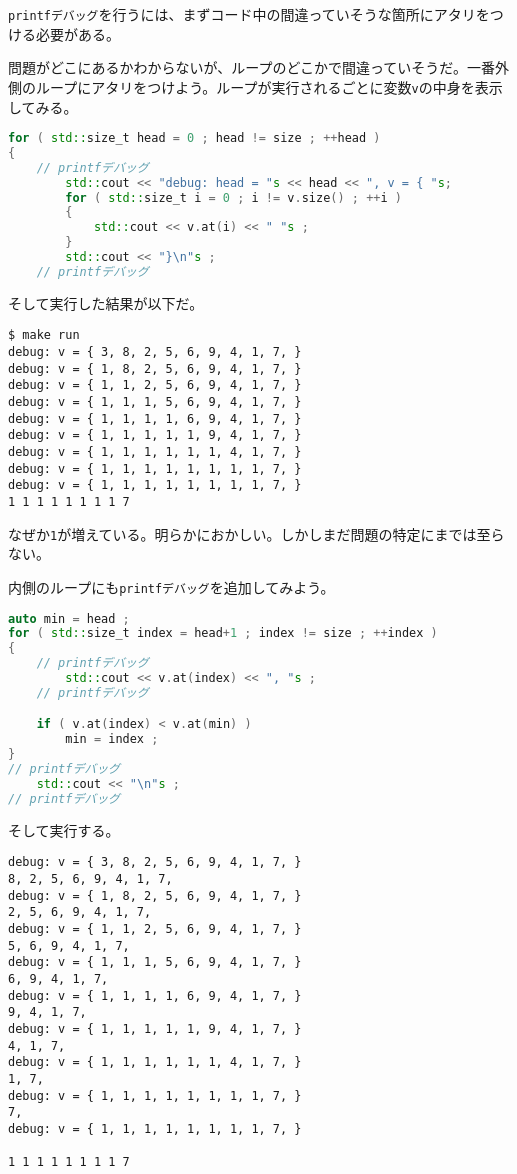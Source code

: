 \texttt{printfデバッグ}を行うには、まずコード中の間違っていそうな箇所にアタリをつける必要がある。

問題がどこにあるかわからないが、ループのどこかで間違っていそうだ。一番外側のループにアタリをつけよう。ループが実行されるごとに変数\texttt{v}の中身を表示してみる。

\begin{lstlisting}[language={C++}]
for ( std::size_t head = 0 ; head != size ; ++head )
{
    // printfデバッグ
        std::cout << "debug: head = "s << head << ", v = { "s;
        for ( std::size_t i = 0 ; i != v.size() ; ++i )
        {
            std::cout << v.at(i) << " "s ;
        }
        std::cout << "}\n"s ;
    // printfデバッグ
\end{lstlisting}

そして実行した結果が以下だ。

\begin{lstlisting}[style=terminal]
$ make run
debug: v = { 3, 8, 2, 5, 6, 9, 4, 1, 7, }
debug: v = { 1, 8, 2, 5, 6, 9, 4, 1, 7, }
debug: v = { 1, 1, 2, 5, 6, 9, 4, 1, 7, }
debug: v = { 1, 1, 1, 5, 6, 9, 4, 1, 7, }
debug: v = { 1, 1, 1, 1, 6, 9, 4, 1, 7, }
debug: v = { 1, 1, 1, 1, 1, 9, 4, 1, 7, }
debug: v = { 1, 1, 1, 1, 1, 1, 4, 1, 7, }
debug: v = { 1, 1, 1, 1, 1, 1, 1, 1, 7, }
debug: v = { 1, 1, 1, 1, 1, 1, 1, 1, 7, }
1 1 1 1 1 1 1 1 7 
\end{lstlisting}

なぜか\texttt{1}が増えている。明らかにおかしい。しかしまだ問題の特定にまでは至らない。

内側のループにも\texttt{printfデバッグ}を追加してみよう。

\begin{lstlisting}[language={C++}]
auto min = head ;
for ( std::size_t index = head+1 ; index != size ; ++index )
{
    // printfデバッグ
        std::cout << v.at(index) << ", "s ;
    // printfデバッグ

    if ( v.at(index) < v.at(min) )
        min = index ;
}
// printfデバッグ
    std::cout << "\n"s ;
// printfデバッグ
\end{lstlisting}

そして実行する。

\begin{lstlisting}[style=terminal]
debug: v = { 3, 8, 2, 5, 6, 9, 4, 1, 7, }
8, 2, 5, 6, 9, 4, 1, 7, 
debug: v = { 1, 8, 2, 5, 6, 9, 4, 1, 7, }
2, 5, 6, 9, 4, 1, 7, 
debug: v = { 1, 1, 2, 5, 6, 9, 4, 1, 7, }
5, 6, 9, 4, 1, 7, 
debug: v = { 1, 1, 1, 5, 6, 9, 4, 1, 7, }
6, 9, 4, 1, 7, 
debug: v = { 1, 1, 1, 1, 6, 9, 4, 1, 7, }
9, 4, 1, 7, 
debug: v = { 1, 1, 1, 1, 1, 9, 4, 1, 7, }
4, 1, 7, 
debug: v = { 1, 1, 1, 1, 1, 1, 4, 1, 7, }
1, 7, 
debug: v = { 1, 1, 1, 1, 1, 1, 1, 1, 7, }
7, 
debug: v = { 1, 1, 1, 1, 1, 1, 1, 1, 7, }

1 1 1 1 1 1 1 1 7 
\end{lstlisting}

